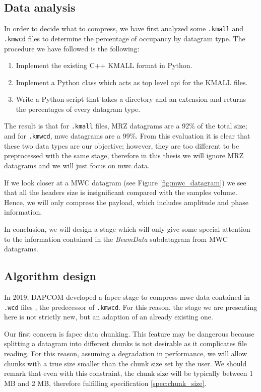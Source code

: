 \subsection{Data analysis} \label{sec:kmall_analysis}
In order to decide what to compress, we have first analyzed some \texttt{.kmall} and \texttt{.kmwcd} files to determine the percentage of occupancy by datagram type. The procedure we have followed is the following:
\begin{enumerate}
	\item Implement the existing C++ KMALL format in Python.
	\item Implement a Python class which acts as top level \acrshort{api} for the KMALL files.
	\item Write a Python script that takes a directory and an extension and returns the percentages of every datagram type.
\end{enumerate}
The result is that for \texttt{.kmall} files, MRZ datagrams are a 92\% of the total size; and for \texttt{.kmwcd}, \acrshort{mwc} datagrams are a 99\%. From this evaluation it is clear that these two data types are our objective; however, they are too different to be preprocessed with the same stage, therefore in this thesis we will ignore MRZ datagrams and we will just focus on \acrshort{mwc} data.

If we look closer at a MWC datagram (see Figure \ref{fig:mwc_datagram}) we see that all the headers size is insignificant compared with the samples volume. Hence, we will only compress the payload, which includes amplitude and phase information.

In conclusion, we will design a stage which will only give some special attention to the information contained in the \textit{BeamData} subdatagram from MWC datagrams.

\subsection{Algorithm design} \label{sec:kmall_design}
In 2019, DAPCOM developed a \acrshort{fapec} stage to compress \acrshort{mwc} data contained in \texttt{.wcd} files \parencite{Portell2019}, the predecessor of \texttt{.kmwcd}. For this reason, the stage we are presenting here is not strictly new, but an adaption of an already existing one.

Our first concern is \acrshort{fapec} data chunking. This feature may be dangerous because splitting a datagram into different chunks is not desirable as it complicates file reading. For this reason, assuming a degradation in performance, we will allow chunks with a true size smaller than the chunk size set by the user. We should remark that even with this constraint, the chunk size will be typically between 1 MB and 2 MB, therefore fulfilling specification \ref{spec:chunk_size}.

